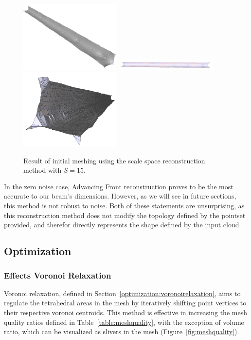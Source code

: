 \documentclass[12pt]{drexelthesis}
\let\Oldsubsection\subsection
\renewcommand{\subsection}{\FloatBarrier\Oldsubsection}
\let\Oldsubsubsection\subsubsection
\renewcommand{\subsubsection}{\FloatBarrier\Oldsubsubsection}
\begin{document}
\begin{figure}[!ht]
	\centering
		\includegraphics[width=2in]{simulated-lab-scan/0noise/clean/scalespace1500.png}
		\includegraphics[width=2in]{simulated-lab-scan/0noise/clean/scalespace1501.png}
		\includegraphics[width=2in]{simulated-lab-scan/0noise/clean/scalespace1502.png}
		\caption[Initial meshing using a scale space reconstruction with $S = 15$]{\centering  Result of initial meshing using the scale space reconstruction method with $S = 15$.}
		\label{zeronoise:scalespace15}
\end{figure}

In the zero noise case, Advancing Front reconstruction proves to be the most accurate to our beam's dimensions. However, as we will see in future sections, this method is not robust to noise. Both of these statements are unsurprising, as this reconstruction method does not modify the topology defined by the pointset provided, and therefor directly represents the shape defined by the input cloud.

\subsection{Optimization}
\subsubsection{Effects Voronoi Relaxation}

Voronoi relaxation, defined in Section~\ref{optimization:voronoirelaxation}, aims to regulate the tetrahedral areas in the mesh by iteratively shifting point vertices to their respective voronoi centroids. This method is effective in increasing the mesh quality ratios defined in Table~\ref{table:meshquality}, with the exception of volume ratio, which can be visualized as slivers in the mesh (Figure~\ref{fig:meshquality}).
\end{document}
